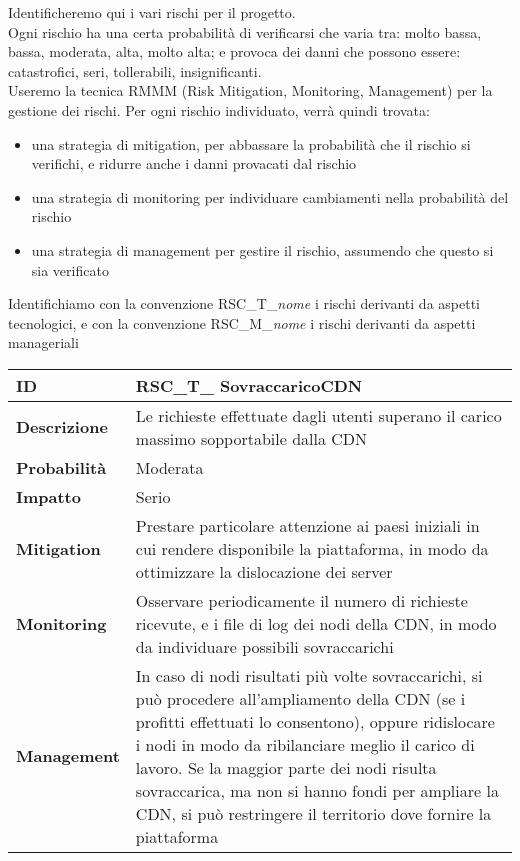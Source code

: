 Identificheremo qui i vari rischi per il progetto.\\
Ogni rischio ha una certa probabilità di verificarsi che varia tra: molto bassa, bassa, moderata, alta, molto alta; e provoca dei danni che possono essere: catastrofici, seri, tollerabili, insignificanti.\\
Useremo la tecnica RMMM (Risk Mitigation, Monitoring, Management) per la gestione dei rischi. Per ogni rischio individuato, verrà quindi trovata: 
\begin{itemize}
	\item una strategia di mitigation, per abbassare la probabilità che il rischio si verifichi, e ridurre anche i danni provacati dal rischio
	\item una strategia di monitoring per individuare cambiamenti nella probabilità del rischio
	\item una strategia di management per gestire il rischio, assumendo che questo si sia verificato
\end{itemize}
Identifichiamo con la convenzione RSC\_T\_\textit{nome} i rischi derivanti da aspetti tecnologici, e con la convenzione RSC\_M\_\textit{nome} i rischi derivanti da aspetti manageriali \\

\begin{tabular}{|p{2.2cm}|p{9.6cm}| } 
 	\hline
	 \textbf{ID} & RSC\_T\_ SovraccaricoCDN\\ [0.5ex] 
	\hline
	\textbf{Descrizione} & Le richieste effettuate dagli utenti superano il carico massimo sopportabile dalla CDN \\ 
	\hline
	\textbf{Probabilità} &  Moderata \\ 
	\hline
	\textbf{Impatto} &  Serio \\ 
	\hline
	\textbf{Mitigation} & Prestare particolare attenzione ai paesi iniziali in cui rendere disponibile la piattaforma, in modo da ottimizzare la dislocazione dei server \\ 
	\hline
	\textbf{Monitoring} & Osservare periodicamente il numero di richieste ricevute, e i file di log dei nodi della CDN, in modo da individuare possibili sovraccarichi\\ 
	\hline
	\textbf{Management} & In caso di nodi risultati più volte sovraccarichi, si può procedere all'ampliamento della CDN (se i profitti effettuati lo consentono), oppure ridislocare i nodi in modo da ribilanciare meglio il carico di lavoro. Se la maggior parte dei nodi risulta sovraccarica, ma non si hanno fondi per ampliare la CDN, si può restringere il territorio dove fornire la piattaforma\\ 
	\hline
\end{tabular}

